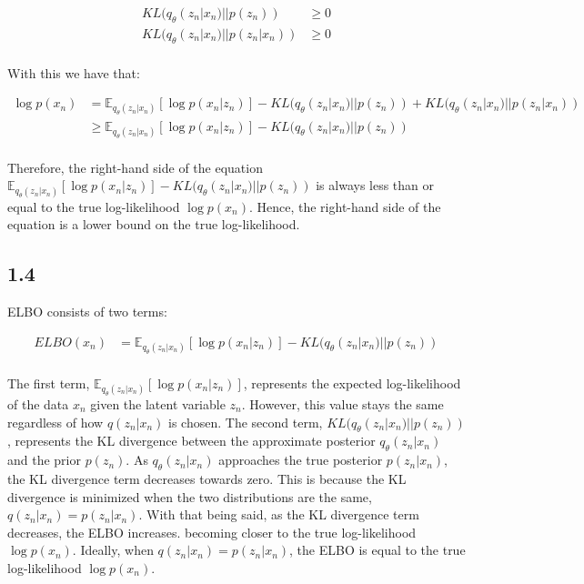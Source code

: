 \documentclass{article}
\begin{document}
\begin{align*}
    KL(q_{\theta}(z_n|x_n) || p(z_n)) &\geq 0 \\
    KL(q_{\theta}(z_n|x_n) || p(z_n|x_n)) &\geq 0 \\
\end{align*}

With this we have that: 

\begin{align*}
  \log p(x_n) &= \mathbb{E}_{q_{\theta}(z_n|x_n)}[\log p(x_n|z_n)] - KL(q_{\theta}(z_n|x_n) || p(z_n)) + KL(q_{\theta}(z_n|x_n) || p(z_n|x_n)) \\
  &\geq \mathbb{E}_{q_{\theta}(z_n|x_n)}[\log p(x_n|z_n)] - KL(q_{\theta}(z_n|x_n) || p(z_n)) \\
\end{align*}

Therefore, the right-hand side of the equation $\mathbb{E}_{q_{\theta}(z_n|x_n)}[\log p(x_n|z_n)] - KL(q_{\theta}(z_n|x_n) || p(z_n))$ is
always less than or equal to the true log-likelihood $\log p(x_n)$. Hence, the right-hand side of the equation is a lower bound on the true log-likelihood.


\subsection*{1.4}

ELBO consists of two terms: 

\begin{align*}
    ELBO(x_n) &= \mathbb{E}_{q_{\theta}(z_n|x_n)}[\log p(x_n|z_n)] - KL(q_{\theta}(z_n|x_n) || p(z_n)) \\
\end{align*}

The first term, $\mathbb{E}_{q_{\theta}(z_n|x_n)}[\log p(x_n|z_n)]$, represents the expected log-likelihood of the data $x_n$ given the latent variable $z_n$.
However, this value stays the same regardless of how $q(z_n|x_n)$ is chosen.
The second term, $KL(q_{\theta}(z_n|x_n) || p(z_n))$, represents the KL divergence between the approximate posterior $q_{\theta}(z_n|x_n)$ and the prior $p(z_n)$.
As $q_{\theta}(z_n|x_n)$ approaches the true posterior $p(z_n|x_n)$, the KL divergence term decreases towards zero. This
is because the KL divergence is minimized when the two distributions are the same, $q(z_n|x_n) = p(z_n|x_n)$.
With that being said, as the KL divergence term decreases, the ELBO increases. becoming closer to the true log-likelihood $\log p(x_n)$.
Ideally, when $q(z_n|x_n) = p(z_n|x_n)$, the ELBO is equal to the true log-likelihood $\log p(x_n)$.
\end{document}
